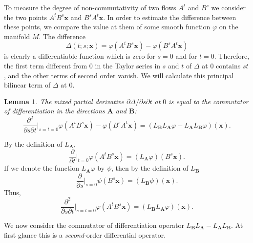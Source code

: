 \documentclass{book}
\numberwithin{equation}{section}
\theoremstyle{plain}
\newtheorem{lem}[thm]{Lemma} %
\let\oldendproof\endproof
\renewenvironment{proof}[1][\proofname]{%
  \oldproof[\textsc{#1}]%
}{\oldendproof}
\theoremstyle{definition}
\theoremstyle{remark}
\theoremstyle{smallcap}
\numberwithin{prob}{section}
\begin{document}
To measure the degree of non-commutativity
of two flows $A^t$ and $B^s$ we consider the two points
$A^tB^s\mathbf x$ and $B^sA^t\mathbf x$.
%
In order to estimate the difference between these points,
we compare the value at them of some smooth function
$\varphi$ on the manifold $M$. The difference
$$
\Delta(t; s; \mathbf x)
=
\varphi(A^tB^s\mathbf x)
-
\varphi(B^sA^t\mathbf x)
$$
is clearly a differentiable function which is zero for $s = 0$
and for $t = 0$.
Therefore, the first term different from $0$ in the Taylor series
in $s$ and $t$ of $\Delta$ at $0$ contains $st$,
and the other terms of second order vanish.
%
We will calculate this principal bilinear term of $\Delta$ at $0$.


\begin{lem}
  The mixed partial derivative $\partial \Delta/\partial s \partial t$ at $0$
  is equal to the commutator of differentiation in the directions
  $\mathbf A$ and $\mathbf B$:
  $$
  \frac{\partial^2}{\partial s \partial t}\bigg|_{s=t=0}
  {\varphi(A^tB^s\mathbf x) - \varphi(B^sA^t\mathbf x)}
  =
  (L_\mathbf{B} L_\mathbf{A} \varphi
  -L_\mathbf{A} L_\mathbf{B} \varphi)
  (\mathbf x).
  $$
\end{lem}

\begin{proof}
  By the definition of $L_\mathbf{A}$,
  $$
  \frac{\partial}{\partial t}\bigg|_{t=0}
  \varphi(A^tB^s\mathbf x)
  =
  (L_\mathbf{A} \varphi)(B^s\mathbf x).
  $$
  If we denote the function $L_\mathbf{A}\varphi$ by $\psi$,
  then by the definition of $L_\mathbf{B}$
  $$
  \frac{\partial}{\partial s}\bigg|_{s=0}
  \psi(B^s\mathbf x)
  =
  (L_\mathbf{B} \psi)(\mathbf x).
  $$
  Thus,
  $$
  \frac{\partial^2}{\partial s \partial t}\bigg|_{s=t=0}
  \varphi(A^tB^s\mathbf x)
  =
  (L_\mathbf{B} L_\mathbf{A} \varphi)(\mathbf x).
  $$
\end{proof}

We now consider the commutator of differentiation operator
$L_\mathbf{B} L_\mathbf{A} - L_\mathbf{A} L_\mathbf{B}$.
%
At first glance this is a \emph{second}-order differential operator.
\end{document}
